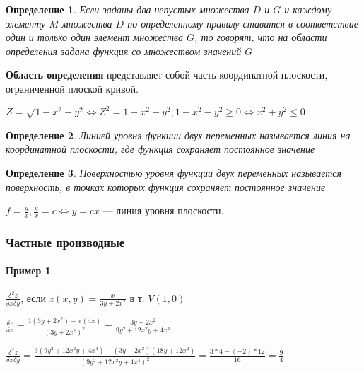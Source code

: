 \documentclass{article}
\newtheorem{definition}{Определение}
\begin{document}
\begin{flushleft}

\begin{definition}
Если заданы два непустых множества $D$ и $G$ и каждому элементу $M$ множества $D$ по определенному правилу ставится в соответствие один и только один элемент множества $G$, то говорят, что на области определения задана функция со множеством значений $G$
\end{definition}

\textbf{Область определения} представляет собой часть координатной плоскости, ограниченной плоской кривой.

\hfill

$Z = \sqrt{1 - x^2 - y^2} \Longleftrightarrow Z^{2} = 1 - x^2 - y^2, 1 - x^2 - y^2 \ge 0 \Longleftrightarrow x^2 + y^2 \le 0$

\begin{definition}
    Линией уровня функции двух переменных называется линия на координатной плоскости, где функция сохраняет постоянное значение
\end{definition}

\begin{definition}
    Поверхностью уровня функции двух переменных называется поверхность, в точках которых функция сохраняет постоянное значение
\end{definition}

$f = \frac{y}{x}, \frac{y}{x} = c \Longleftrightarrow y = cx$ — линия уровня плоскости.

\subsubsection{Частные производные}

\paragraph{Пример 1}

\hfill

\hfill

$\frac{\delta^2 z}{\delta x \delta y}$, если $z(x, y) = \frac{x}{3y + 2x^2}$ в т. $V(1, 0)$

$\frac{\delta z}{\delta x} = \frac{1(3y + 2x^2) - x(4x)}{(3y + 2x^2)^2} = \frac{3y - 2x^2}{9y^2 + 12x^2 y + 4x^4}$

$\frac{\delta^2 z}{\delta x \delta y} = \frac{3(9y^2 + 12x^2 y + 4x^4) - (3y - 2x^2)(18y + 12x^2)}{(9y^2 + 12x^2 y + 4x^4)^2} = \frac{3 * 4 - (-2) * 12}{16} = \frac{9}{4}$


\end{flushleft}
\end{document}
